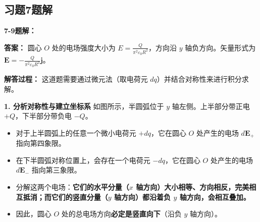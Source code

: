 \subsection*{习题7题解}

\textbf{7-9题解： }
\setcounter{equation}{0}
\renewcommand{\theHequation}{7-9.\arabic{equation}}

\textbf{答案： }
圆心 $O$ 处的电场强度大小为 $E = \frac{Q}{\pi^2 \varepsilon_0 R^2}$，方向沿 $y$ 轴负方向。矢量形式为 $\mathbf{E} = -\frac{Q}{\pi^2\varepsilon_0 R^2} \mathbf{j}$。

\textbf{解答过程： }
这道题需要通过微元法（取电荷元 $dq$）并结合对称性来进行积分求解。

\textbf{1. 分析对称性与建立坐标系}
如图所示，半圆弧位于 $y$ 轴左侧。上半部分带正电 $+Q$，下半部分带负电 $-Q$。

\begin{itemize}
	\item 对于上半圆弧上的任意一个微小电荷元 $+dq$，它在圆心 $O$ 处产生的电场 $d\mathbf{E}_+$ 指向第四象限。
	\item 在下半圆弧对称位置上，会存在一个电荷元 $-dq$，它在圆心 $O$ 处产生的电场 $d\mathbf{E}_-$ 指向第三象限。
	\item 分解这两个电场：\textbf{它们的水平分量（$x$ 轴方向）大小相等、方向相反，完美相互抵消；而它们的竖直分量（$y$ 轴方向）都沿着负 $y$ 轴方向，会相互叠加。}
	\item 因此，圆心 $O$ 处的总电场方向\textbf{必定是竖直向下}（沿负 $y$ 轴方向）。
\end{itemize}

